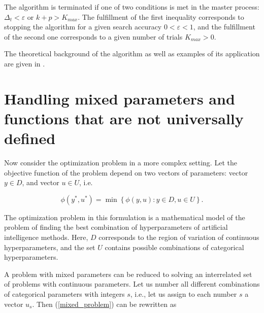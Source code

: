 \documentclass[runningheads]{llncs}
\begin{document}
The algorithm is terminated if one of two conditions is met in the master process: $\Delta_t< \varepsilon$ or $k+p>K_{max}$. The fulfillment of the first inequality corresponds to stopping the algorithm for a given search accuracy $0< \varepsilon <1$, and the fulfillment of the second one corresponds to a given number of trials $K_{max}>0$.

The theoretical background of the algorithm as well as examples of its application are given in  \cite{Barkalov2018,Barkalov2023,Gubaydullin2021,Strongin2020}.

\section{Handling mixed parameters and functions that are not universally defined}\label{sec:MP}

Now consider the optimization problem in a more complex setting. Let the objective function of the problem depend on two vectors of parameters: vector $y \in D$, and vector $u \in U$, i.e.

\begin{equation}\label{mixed_problem} 
\phi(y^*, u^*) = \min \left\{\phi(y, u): y \in D, u \in U\right\}.
\end{equation}

The optimization problem in this formulation is a mathematical model of the problem of finding the best combination of hyperparameters of artificial intelligence methods. Here, $D$ corresponds to the region of variation of continuous hyperparameters, and the set $U$ contains possible combinations of categorical hyperparameters.

A problem with mixed parameters can be reduced to solving an interrelated set of problems with continuous parameters. Let us number all different combinations of categorical parameters with integers $s$, i.e., let us assign to each number $s$ a vector $u_s$. Then (\ref{mixed_problem}) can be rewritten as 
\end{document}
